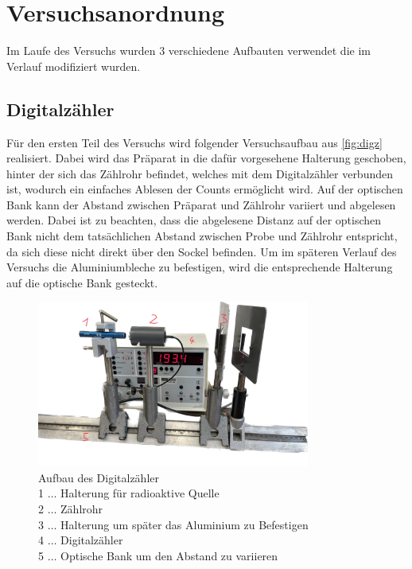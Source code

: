 \documentclass[12pt,english,ngerman]{scrartcl}
\begin{document}
\section{Versuchsanordnung}\label{sec:Versuchsanordnung}

Im Laufe des Versuchs wurden 3 verschiedene Aufbauten verwendet die im Verlauf
modifiziert wurden.

\subsection{Digitalzähler}\label{aufbau_Digz}

Für den ersten Teil des Versuchs wird folgender Versuchsaufbau aus
\autoref{fig:digz} realisiert. Dabei wird das Präparat in die dafür vorgesehene
Halterung geschoben, hinter der sich das Zählrohr befindet, welches mit dem
Digitalzähler verbunden ist, wodurch ein einfaches Ablesen der Counts
ermöglicht wird. Auf der optischen Bank kann der Abstand zwischen Präparat und
Zählrohr variiert und abgelesen werden. Dabei ist zu beachten, dass die
abgelesene Distanz auf der optischen Bank nicht dem tatsächlichen Abstand
zwischen Probe und Zählrohr entspricht, da sich diese nicht direkt über den
Sockel befinden. Um im späteren Verlauf des Versuchs die Aluminiumbleche zu
befestigen, wird die entsprechende Halterung auf die optische Bank gesteckt.

\begin{figure}[H]
	\begin{center}
		\includegraphics[width = 0.8\textwidth]{./figures/digz.png}

	\end{center}
	\caption[Aufbau des Digitalzähler]{Aufbau des Digitalzähler \\
		1 \(\dots\) Halterung für radioaktive Quelle \\
		2 \(\dots\) Zählrohr \\
		3 \(\dots\) Halterung um später das Aluminium zu Befestigen \\
		4 \(\dots\) Digitalzähler \\
		5 \(\dots\) Optische Bank um den Abstand zu variieren}
	\label{fig:digz}

\end{figure}
\end{document}

